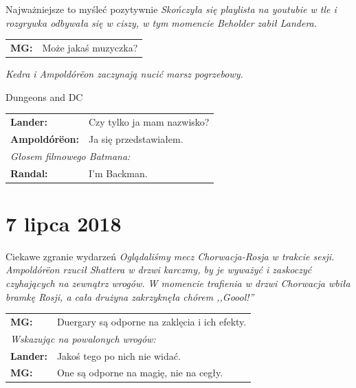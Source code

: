 \documentclass[10pt,twoside,twocolumn]{book}
\begin{document}
\begin{rpg-quotebox}{Najważniejsze to myśleć pozytywnie}
   \textit{Skończyła się playlista na youtubie w tle i rozgrywka odbywała się w ciszy, w tym momencie Beholder zabił Landera.}\\

   \begin{tabularx}{\columnwidth}{lX}
      \textbf{MG:} & Może jakaś muzyczka?\\
   \end{tabularx}

\textit{Kedra i Ampoldórëon zaczynają nucić marsz pogrzebowy.}\\
\end{rpg-quotebox}


\begin{rpg-quotebox}{Dungeons and DC}
   \begin{tabularx}{\columnwidth}{lX}
      \textbf{Lander:} & Czy tylko ja mam nazwisko?\\
      \textbf{Ampoldórëon:} & Ja się przedstawiałem.\\
      \multicolumn{2}{l}{\textit{Głosem filmowego Batmana:}}\\
      \textbf{Randal:} & I'm Backman.\\
   \end{tabularx}
\end{rpg-quotebox}


\section*{7 lipca 2018}


\begin{rpg-quotebox}{Ciekawe zgranie wydarzeń}
   \textit{Oglądaliśmy mecz Chorwacja-Rosja w trakcie sesji. Ampoldórëon rzucił Shattera w drzwi karczmy, by je wyważyć i zaskoczyć czyhających na zewnątrz wrogów. W momencie trafienia  w drzwi Chorwacja wbiła bramkę Rosji, a cała drużyna zakrzyknęła chórem ,,Goool!''}\\
\end{rpg-quotebox}


\begin{rpg-quotebox}{}
   \begin{tabularx}{\columnwidth}{lX}
      \textbf{MG:} & Duergary są odporne na zaklęcia i ich efekty.\\
      \multicolumn{2}{l}{\textit{Wskazując na powalonych wrogów:}}\\
      \textbf{Lander:} & Jakoś tego po nich nie widać.\\
      \textbf{MG:} & One są odporne na magię, nie na cegły.\\
   \end{tabularx}
\end{rpg-quotebox}
\end{document}
